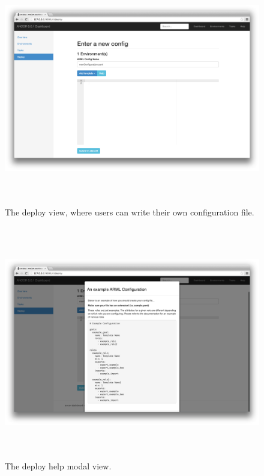 \begin{figure}[htb]%

    \includegraphics[height=4.0in]{figures/deploy.png}

    \caption[Deploy view.
    ]{The deploy view, where users can write their own configuration file.}

    \label{deployView}
\end{figure}

\begin{figure}[htb]%

    \includegraphics[height=4.0in]{figures/deploy-help.png}

    \caption[Deploy help view.
    ]{The deploy help modal view.}

    \label{deployHelpView}
\end{figure}

